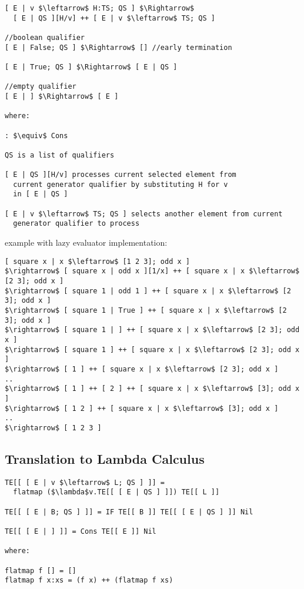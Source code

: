\documentclass[8pt]{extarticle}
\begin{document}
\begin{multicols*}{2}
\begin{lstlisting}
[ E | v $\leftarrow$ H:TS; QS ] $\Rightarrow$
  [ E | QS ][H/v] ++ [ E | v $\leftarrow$ TS; QS ]

//boolean qualifier
[ E | False; QS ] $\Rightarrow$ [] //early termination

[ E | True; QS ] $\Rightarrow$ [ E | QS ]

//empty qualifier
[ E | ] $\Rightarrow$ [ E ]

where:

: $\equiv$ Cons

QS is a list of qualifiers

[ E | QS ][H/v] processes current selected element from
  current generator qualifier by substituting H for v
  in [ E | QS ]

[ E | v $\leftarrow$ TS; QS ] selects another element from current
  generator qualifier to process
\end{lstlisting}

example with lazy evaluator implementation:

\begin{lstlisting}
[ square x | x $\leftarrow$ [1 2 3]; odd x ]
$\rightarrow$ [ square x | odd x ][1/x] ++ [ square x | x $\leftarrow$ [2 3]; odd x ]
$\rightarrow$ [ square 1 | odd 1 ] ++ [ square x | x $\leftarrow$ [2 3]; odd x ]
$\rightarrow$ [ square 1 | True ] ++ [ square x | x $\leftarrow$ [2 3]; odd x ]
$\rightarrow$ [ square 1 | ] ++ [ square x | x $\leftarrow$ [2 3]; odd x ]
$\rightarrow$ [ square 1 ] ++ [ square x | x $\leftarrow$ [2 3]; odd x ]
$\rightarrow$ [ 1 ] ++ [ square x | x $\leftarrow$ [2 3]; odd x ]
..
$\rightarrow$ [ 1 ] ++ [ 2 ] ++ [ square x | x $\leftarrow$ [3]; odd x ]
$\rightarrow$ [ 1 2 ] ++ [ square x | x $\leftarrow$ [3]; odd x ]
..
$\rightarrow$ [ 1 2 3 ]
\end{lstlisting}

\subsection{Translation to Lambda Calculus}
\begin{lstlisting}
TE[[ [ E | v $\leftarrow$ L; QS ] ]] =
  flatmap ($\lambda$v.TE[[ [ E | QS ] ]]) TE[[ L ]]

TE[[ [ E | B; QS ] ]] = IF TE[[ B ]] TE[[ [ E | QS ] ]] Nil

TE[[ [ E | ] ]] = Cons TE[[ E ]] Nil

where:

flatmap f [] = []
flatmap f x:xs = (f x) ++ (flatmap f xs)


\end{lstlisting}
\end{multicols*}
\end{document}
